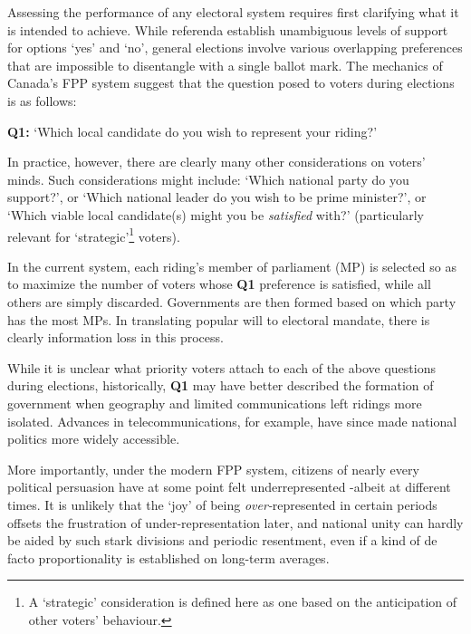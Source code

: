 Assessing the performance of any electoral system requires first clarifying what it is intended to achieve.
While referenda establish unambiguous levels of support for options `yes' and `no', general elections involve various overlapping preferences that are impossible to disentangle with a single ballot mark.
The mechanics of Canada's FPP system suggest that the question posed to voters during elections is as follows:
\begin{tcolorbox}[colback=white!5!white,colframe=blue!55!black]
{\textbf{Q1:} } `Which local candidate do you wish to represent your riding?'
\end{tcolorbox}
In practice, however, there are clearly many other considerations on voters' minds.
Such considerations might include: `Which national party do you support?', or `Which national leader do you wish to be prime minister?', or `Which viable local candidate(s) might you be \emph{satisfied} with?' (particularly relevant for `strategic'\footnote{A `strategic'  consideration is defined here as one based on the anticipation of other voters' behaviour.} voters).

In the current system, each riding's member of parliament (MP) is selected so as to maximize the number of voters whose {\textbf{Q1}} preference is satisfied, while all others are simply discarded. Governments are then formed based on which party has the most MPs.
In translating popular will to electoral mandate, there is clearly information loss in this process.

While it is unclear what priority voters attach to each of the above questions during elections, historically, \textbf{Q1} may have better described the formation of government when geography and limited communications left ridings more isolated.
Advances in telecommunications, for example, have since made national politics more widely accessible.



More importantly, under the modern FPP system, citizens of nearly every political persuasion have at some point felt underrepresented \--albeit at different times. It is unlikely that the `joy' of being \emph{over-}represented in certain periods offsets the frustration of under-representation later, and
 national unity can hardly be aided by such stark divisions and periodic resentment, even if a kind of de facto proportionality is established on long-term averages.

